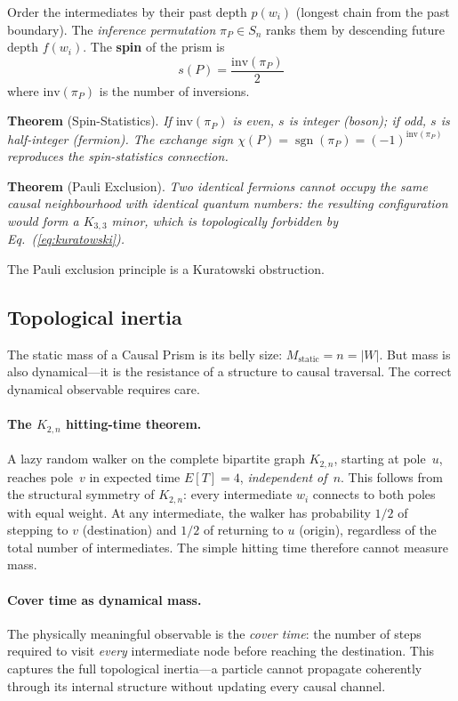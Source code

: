 \documentclass[aps,prd,twocolumn,superscriptaddress,nofootinbib,amsmath,amssymb,longbibliography]{revtex4-2}
\newcommand{\sgn}{\operatorname{sgn}}
\begin{document}
Order the intermediates by their past depth
$p(w_i)$ (longest chain from the past boundary).
The \emph{inference permutation} $\pi_P \in S_n$ ranks them by
descending future depth $f(w_i)$.
The \textbf{spin} of the prism is
\begin{equation}
  s(P) = \frac{\text{inv}(\pi_P)}{2}
\end{equation}
where $\text{inv}(\pi_P)$ is the number of inversions.

\textbf{Theorem} (Spin-Statistics).
\emph{If $\text{inv}(\pi_P)$ is even, $s$ is integer (boson);
if odd, $s$ is half-integer (fermion).
The exchange sign $\chi(P) = \sgn(\pi_P) = (-1)^{\text{inv}(\pi_P)}$
reproduces the spin-statistics connection.}

\textbf{Theorem} (Pauli Exclusion).
\emph{Two identical fermions cannot occupy the same causal neighbourhood
with identical quantum numbers: the resulting configuration would form a
$K_{3,3}$ minor, which is topologically forbidden by Eq.~(\ref{eq:kuratowski}).}

The Pauli exclusion principle is a Kuratowski obstruction.

\subsection{Topological inertia}\label{sec:inertia}

The static mass of a Causal Prism is its belly size: $M_{\text{static}} = n = |W|$.
But mass is also dynamical---it is the resistance of a structure to
causal traversal.  The correct dynamical observable requires care.

\paragraph{The $K_{2,n}$ hitting-time theorem.}
A lazy random walker on the complete bipartite graph $K_{2,n}$,
starting at pole~$u$, reaches pole~$v$ in expected time $E[T] = 4$,
\emph{independent of~$n$}.
This follows from the structural symmetry of $K_{2,n}$: every
intermediate $w_i$ connects to both poles with equal weight.
At any intermediate, the walker has probability $1/2$ of stepping to
$v$ (destination) and $1/2$ of returning to $u$ (origin), regardless
of the total number of intermediates.
The simple hitting time therefore cannot measure mass.

\paragraph{Cover time as dynamical mass.}
The physically meaningful observable is the \emph{cover time}: the
number of steps required to visit \emph{every} intermediate node
before reaching the destination.
This captures the full topological inertia---a particle cannot
propagate coherently through its internal structure without updating
every causal channel.
\end{document}
